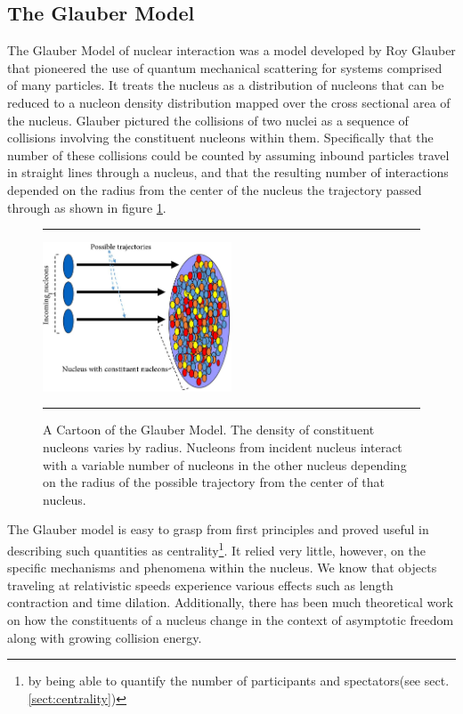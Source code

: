 \subsection{The Glauber Model}
The Glauber Model of nuclear interaction was a model developed by Roy Glauber that pioneered the use of quantum mechanical scattering for systems comprised of many particles. It treats the nucleus as a distribution of nucleons that can be reduced to a nucleon density distribution mapped over the cross sectional area of the nucleus\citep{Miller:2007ri}. Glauber pictured the collisions of two nuclei as a sequence of collisions involving the constituent nucleons within them. Specifically that the number of these collisions could be counted by assuming inbound particles travel in straight lines through a nucleus, and that the resulting number of interactions depended on the radius from the center of the nucleus the trajectory passed through as shown in figure \ref{fig:glaubermodel}.
\begin{figure}[b!]
  \centering
    \rule{35em}{0.5pt}
    \includegraphics[width=0.5\textwidth]{Figures/glauberpic.jpg}

  \caption[A Cartoon of the Glauber Model]{A Cartoon of the Glauber Model. The density of constituent nucleons varies by radius. Nucleons from incident nucleus interact with a variable number of nucleons in the other nucleus depending on the radius of the possible trajectory from the center of that nucleus. \citep{Nagle:2006}}
  \label{fig:glaubermodel}
    \rule{35em}{0.5pt}
\end{figure}

The Glauber model is easy to grasp from first principles and proved useful in describing such quantities as centrality\footnote{by being able to quantify the number of participants and spectators(see sect. \ref{sect:centrality})}. It relied very little, however, on the specific mechanisms and phenomena within the nucleus. We know that objects traveling at relativistic speeds experience various effects such as length contraction and time dilation. Additionally, there has been much theoretical work on how the constituents of a nucleus change in the context of asymptotic freedom along with growing collision energy\citep{PhysRevD.10.1649}.


